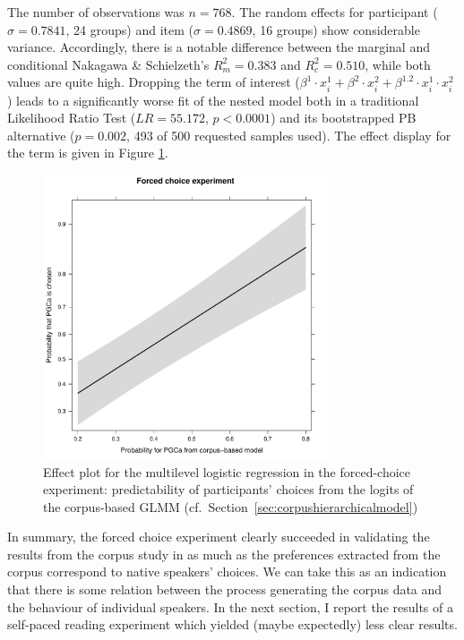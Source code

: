 \documentclass[USenglish]{article}
\begin{document}
The number of observations was $n=768$.
The random effects for participant ($\sigma=0.7841$, 24 groups) and item ($\sigma=0.4869$, 16 groups) show considerable variance.
Accordingly, there is a notable difference between the marginal and conditional Nakagawa \& Schielzeth's $R^2_{m}=0.383$ and $R^2_{c}=0.510$, while both values are quite high.
Dropping the term of interest ($\beta^1\cdot x_i^1+\beta^2\cdot x_i^2+\beta^{1.2}\cdot x_i^1\cdot x_i^2$) leads to a significantly worse fit of the nested model both in a traditional Likelihood Ratio Test ($LR=55.172$, $p<0.0001$) and its bootstrapped PB alternative ($p = 0.002$, 493 of 500 requested samples used).
The effect display for the term is given in Figure \ref{fig:afc:effects}.

\begin{figure}[h]
\centering
\includegraphics[width=0.75\textwidth]{../R/output/fc_effects}
\caption{Effect plot for the multilevel logistic regression in the forced-choice experiment: predictability of participants' choices from the logits of the corpus-based GLMM (cf.\ Section~\ref{sec:corpushierarchicalmodel})}
\label{fig:afc:effects}
\end{figure}

In summary, the forced choice experiment clearly succeeded in validating the results from the corpus study in as much as the preferences extracted from the corpus correspond to native speakers' choices.
We can take this as an indication that there is some relation between the process generating the corpus data and the behaviour of individual speakers.
In the next section, I report the results of a self-paced reading experiment which yielded (maybe expectedly) less clear results.
\end{document}
